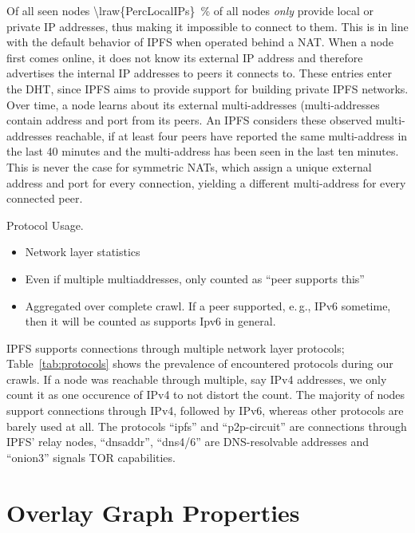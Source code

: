 \documentclass[10pt]{article}
\makeatletter
\newcommand*{\eg}{e.\,g.\@\xspace}
\makeatother
\begin{document}
Of all seen nodes \SI{\lraw{PercLocalIPs}}{\percent} of all nodes \emph{only} provide local or private IP addresses, thus making it impossible to connect to them.
This is in line with the default behavior of IPFS when operated behind a NAT.
When a node first comes online, it does not know its external IP address and therefore advertises the internal IP addresses to peers it connects to.
These entries enter the DHT, since IPFS aims to provide support for building private IPFS networks.
Over time, a node learns about its external multi-addresses (multi-addresses contain address and port from its peers.
An IPFS considers these observed multi-addresses reachable, if at least four peers have reported the same multi-address in the last 40 minutes and the multi-address has been seen in the last ten minutes.
This is never the case for symmetric NATs, which assign a unique external address and port for every connection, yielding a different multi-address for every connected peer.
%
\begin{table}[htb]
  \center
  
  \caption{Protocol Usage.}
  \label{tab:protocols}
\end{table}
%
\begin{itemize}
  \item Network layer statistics
  \item Even if multiple multiaddresses, only counted as ``peer supports this''
  \item Aggregated over complete crawl. If a peer supported, \eg, IPv6 sometime, then it will be counted as supports Ipv6 in general.
\end{itemize}
IPFS supports connections through multiple network layer protocols; Table~\ref{tab:protocols} shows the prevalence of encountered protocols during our crawls.
If a node was reachable through multiple, say IPv4 addresses, we only count it as one occurence of IPv4 to not distort the count.
The majority of nodes support connections through IPv4, followed by IPv6, whereas other protocols are barely used at all.
The protocols ``ipfs'' and ``p2p-circuit'' are connections through IPFS' relay nodes, ``dnsaddr'', ``dns4/6'' are DNS-resolvable addresses and ``onion3'' signals TOR capabilities.

\section{Overlay Graph Properties}
\label{sec:graph_properties}
\end{document}
